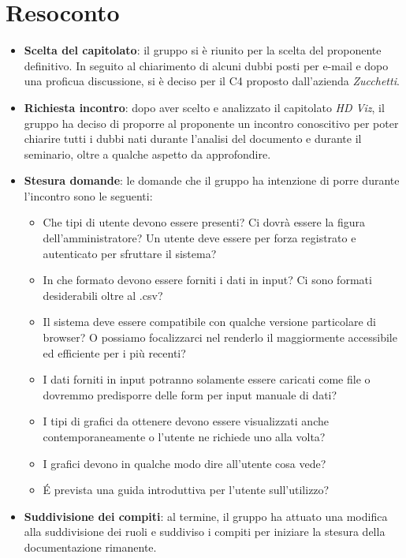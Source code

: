 \section{Resoconto}
\begin{itemize}

\item \textbf{Scelta del capitolato}: il gruppo si è riunito per la scelta del proponente definitivo. In seguito al chiarimento di alcuni dubbi posti per e-mail e dopo una proficua discussione, si è deciso per il  C4 proposto dall'azienda \textit{Zucchetti}.

\item \textbf{Richiesta incontro}: dopo aver scelto e analizzato il capitolato \textit{HD Viz}, il gruppo ha deciso di proporre al proponente un incontro conoscitivo per poter chiarire tutti i dubbi nati durante l'analisi del documento e durante il seminario, oltre a qualche aspetto da approfondire.

\item \textbf{Stesura domande}: le domande che il gruppo ha intenzione di porre durante l'incontro sono le seguenti:
\begin{itemize}
\item Che tipi di utente devono essere presenti? Ci dovrà essere la figura dell'amministratore? Un utente deve essere per forza registrato e autenticato per sfruttare il sistema?
\item In che formato devono essere forniti i dati in input? Ci sono formati desiderabili oltre al .csv?
\item Il sistema deve essere compatibile con qualche versione particolare di browser? O possiamo focalizzarci nel renderlo il maggiormente accessibile ed efficiente per i più recenti?
\item I dati forniti in input potranno solamente essere caricati come file o dovremmo predisporre delle form per input manuale di dati?
\item I tipi di grafici da ottenere devono essere visualizzati anche contemporaneamente o l'utente ne richiede uno alla volta?
\item I grafici devono in qualche modo dire all'utente cosa vede?
\item \'E prevista una guida introduttiva per l'utente sull'utilizzo?
\end{itemize}

\item \textbf{Suddivisione dei compiti}: al termine, il gruppo ha attuato una modifica alla suddivisione dei ruoli e suddiviso i compiti per iniziare la stesura della documentazione rimanente.

\end{itemize}